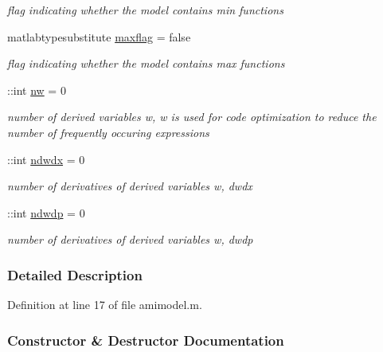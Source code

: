 \begin{DoxyCompactItemize}
\begin{DoxyCompactList}\small\item\em flag indicating whether the model contains min functions \end{DoxyCompactList}\item 
matlabtypesubstitute \mbox{\hyperlink{classamimodel_a1a65e7157ae2262cfa11a783b018364f}{maxflag}} = false
\begin{DoxyCompactList}\small\item\em flag indicating whether the model contains max functions \end{DoxyCompactList}\item 
\+::int \mbox{\hyperlink{classamimodel_a371815f74d602ff1338376abbd1278e4}{nw}} = 0
\begin{DoxyCompactList}\small\item\em number of derived variables w, w is used for code optimization to reduce the number of frequently occuring expressions \end{DoxyCompactList}\item 
\+::int \mbox{\hyperlink{classamimodel_ae6c1afb5529f1cc0ff56552f94e7a2b5}{ndwdx}} = 0
\begin{DoxyCompactList}\small\item\em number of derivatives of derived variables w, dwdx \end{DoxyCompactList}\item 
\+::int \mbox{\hyperlink{classamimodel_aa8af9048cd0280059bed9ef8999ecffb}{ndwdp}} = 0
\begin{DoxyCompactList}\small\item\em number of derivatives of derived variables w, dwdp \end{DoxyCompactList}\end{DoxyCompactItemize}


\subsubsection{Detailed Description}


Definition at line 17 of file amimodel.\+m.



\subsubsection{Constructor \& Destructor Documentation}
\mbox{\label{classamimodel_a05d52506788717b3d482845748446a60}} 
